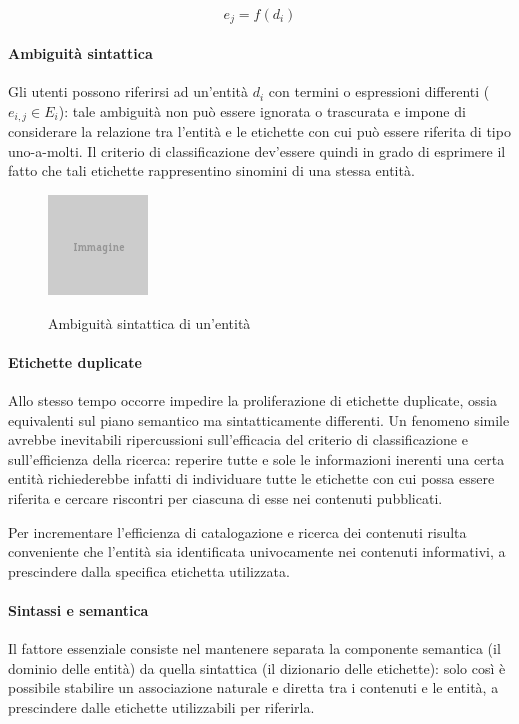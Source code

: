 \begin{equation}
e_j = f(d_i)
\end{equation}

\paragraph{Ambiguità sintattica}
Gli utenti possono riferirsi ad un'entità $d_i$ con termini o espressioni differenti ($e_{i,j} \in E_i$): tale ambiguità non può essere ignorata o trascurata e impone di considerare la relazione tra l'entità e le etichette con cui può essere riferita di tipo uno-a-molti. Il criterio di classificazione dev'essere quindi in grado di esprimere il fatto che tali etichette rappresentino sinomini di una stessa entità.

\begin{figure}[ht]
\begin{center}
\includegraphics{placeholder.png}
\label{fig:tesi:stage:fase-uno:ambiguita-sintattica-entita}
\caption{Ambiguità sintattica di un'entità}
\end{center}
\end{figure}

\paragraph{Etichette duplicate}
Allo stesso tempo occorre impedire la proliferazione di etichette duplicate, ossia equivalenti sul piano semantico ma sintatticamente differenti. Un fenomeno simile avrebbe inevitabili ripercussioni sull'efficacia del criterio di classificazione e sull'efficienza della ricerca: reperire tutte e sole le informazioni inerenti una certa entità richiederebbe infatti di individuare tutte le etichette con cui possa essere riferita e cercare riscontri per ciascuna di esse nei contenuti pubblicati.

Per incrementare l'efficienza di catalogazione e ricerca dei contenuti risulta conveniente che l'entità sia identificata univocamente nei contenuti informativi, a prescindere dalla specifica etichetta utilizzata.

\paragraph{Sintassi e semantica}
Il fattore essenziale consiste nel mantenere separata la componente semantica (il dominio delle entità) da quella sintattica (il dizionario delle etichette): solo così è possibile stabilire un associazione naturale e diretta tra i contenuti e le entità, a prescindere dalle etichette utilizzabili per riferirla.

